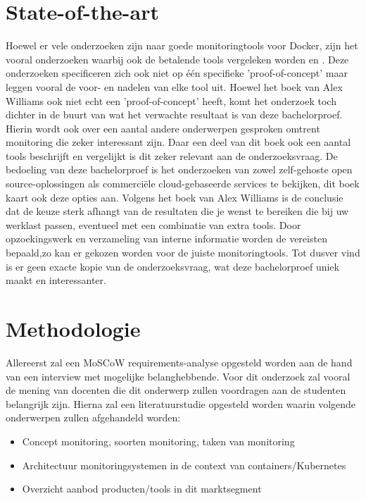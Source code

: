 
\section{State-of-the-art}
\label{sec:state-of-the-art}
Hoewel er vele onderzoeken zijn naar goede monitoringtools voor Docker, zijn het vooral onderzoeken waarbij ook de betalende tools vergeleken worden \autocite{Ribenzaft2020} en \autocite{Cirelly2020}. Deze onderzoeken specificeren zich ook niet op één specifieke 'proof-of-concept' maar leggen vooral de voor- en nadelen van elke tool uit. Hoewel het boek van Alex Williams \autocite{Cole2016} ook niet echt een 'proof-of-concept' heeft, komt het onderzoek toch dichter in de buurt van wat het verwachte resultaat is van deze bachelorproef. Hierin wordt ook over een aantal andere onderwerpen gesproken omtrent monitoring die zeker interessant zijn. Daar een deel van dit boek ook een aantal tools beschrijft en vergelijkt is dit zeker relevant aan de onderzoeksvraag. De bedoeling van deze bachelorproef is het onderzoeken van zowel zelf-gehoste open source-oplossingen als commerciële cloud-gebaseerde services te bekijken, dit boek kaart ook deze opties aan. Volgens het boek van Alex Williams \autocite{Cole2016} is de conclusie dat de keuze sterk afhangt van de resultaten die je wenst te bereiken die bij uw werklast passen, eventueel met een combinatie van extra tools. Door opzoekingswerk en verzameling van interne informatie worden de vereisten bepaald,zo kan er gekozen worden voor de juiste monitoringtools. Tot dusver vind is er geen exacte kopie van de onderzoeksvraag, wat deze bachelorproef uniek maakt en interessanter.

\section{Methodologie}
\label{sec:methodologie}

Allereerst zal een MoSCoW requirements-analyse opgesteld worden aan de hand van een interview met mogelijke belanghebbende. Voor dit onderzoek zal vooral de mening van docenten die dit onderwerp zullen voordragen aan de studenten belangrijk zijn. Hierna zal een literatuurstudie opgesteld worden waarin volgende onderwerpen zullen afgehandeld worden:

\begin{itemize}
    \item Concept monitoring, soorten monitoring, taken van monitoring
    \item Architectuur monitoringsystemen in de context van containers/Kubernetes
    \item Overzicht aanbod producten/tools in dit marktsegment\\
\end{itemize}


